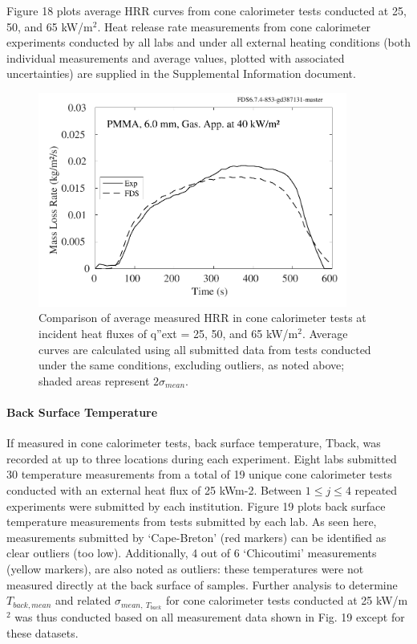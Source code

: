 \documentclass{book}
\begin{document}
Figure 18 plots average HRR curves from cone calorimeter tests conducted at 25, 50, and 65 kW/m$^2$. Heat release rate measurements from cone calorimeter experiments conducted by all labs and under all external heating conditions (both individual measurements and average values, plotted with associated uncertainties) are supplied in the Supplemental Information document.

\begin{figure}
  \centering
  \includegraphics[width=4in]{SCRIPT_FIGURES/PMMA_40}
  \caption{Comparison of average measured HRR in cone calorimeter tests at incident heat fluxes of q”ext = 25, 50, and 65 kW/m$^2$. Average curves are calculated using all submitted data from tests conducted under the same conditions, excluding outliers, as noted above; shaded areas represent $2\sigma_{mean}$.}
  \label{Fig_18}
\end{figure}


\paragraph{Back Surface Temperature}

If measured in cone calorimeter tests, back surface temperature, Tback, was recorded at up to three locations during each experiment. Eight labs submitted 30 temperature measurements from a total of 19 unique cone calorimeter tests conducted with an external heat flux of 25 kWm-2. Between $1\le j\le4$ repeated experiments were submitted by each institution.  Figure 19 plots back surface temperature measurements from tests submitted by each lab. As seen here, measurements submitted by ‘Cape-Breton’ (red markers) can be identified as clear outliers (too low). Additionally, 4 out of 6 ‘Chicoutimi’ measurements (yellow markers), are also noted as outliers: these temperatures were not measured directly at the back surface of samples. Further analysis to determine $T_{back,mean}$ and related $\sigma_{mean,\ T_{back}}$ for cone calorimeter tests conducted at 25 kW/m$^2$ was thus conducted based on all measurement data shown in Fig. 19 except for these datasets.
\end{document}
